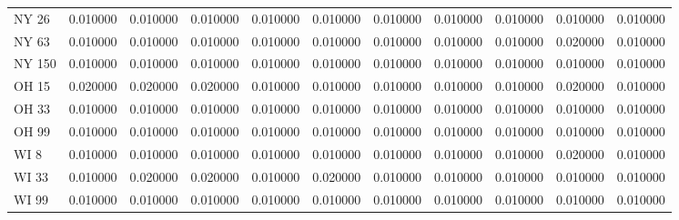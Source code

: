 \begin{tabular}{lrrrrrrrrrr}
NY 26 & 0.010000 & 0.010000 & 0.010000 & 0.010000 & 0.010000 & 0.010000 & 0.010000 & 0.010000 & 0.010000 & 0.010000 \\
NY 63 & 0.010000 & 0.010000 & 0.010000 & 0.010000 & 0.010000 & 0.010000 & 0.010000 & 0.010000 & 0.020000 & 0.010000 \\
NY 150 & 0.010000 & 0.010000 & 0.010000 & 0.010000 & 0.010000 & 0.010000 & 0.010000 & 0.010000 & 0.010000 & 0.010000 \\
OH 15 & 0.020000 & 0.020000 & 0.020000 & 0.010000 & 0.010000 & 0.010000 & 0.010000 & 0.010000 & 0.020000 & 0.010000 \\
OH 33 & 0.010000 & 0.010000 & 0.010000 & 0.010000 & 0.010000 & 0.010000 & 0.010000 & 0.010000 & 0.010000 & 0.010000 \\
OH 99 & 0.010000 & 0.010000 & 0.010000 & 0.010000 & 0.010000 & 0.010000 & 0.010000 & 0.010000 & 0.010000 & 0.010000 \\
WI 8 & 0.010000 & 0.010000 & 0.010000 & 0.010000 & 0.010000 & 0.010000 & 0.010000 & 0.010000 & 0.020000 & 0.010000 \\
WI 33 & 0.010000 & 0.020000 & 0.020000 & 0.010000 & 0.020000 & 0.010000 & 0.010000 & 0.010000 & 0.010000 & 0.010000 \\
WI 99 & 0.010000 & 0.010000 & 0.010000 & 0.010000 & 0.010000 & 0.010000 & 0.010000 & 0.010000 & 0.010000 & 0.010000 \\
\bottomrule
\end{tabular}
